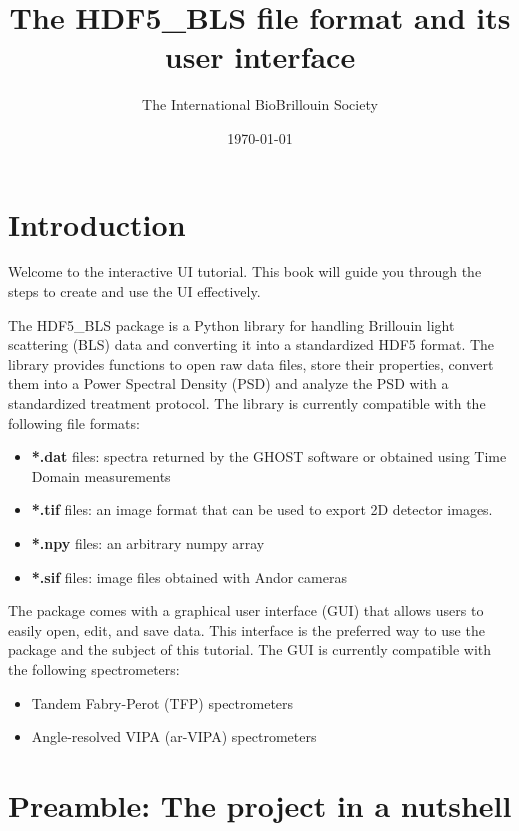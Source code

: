 \documentclass{book}
\title{The HDF5\_BLS file format and its user interface}
\author{The International BioBrillouin Society}
\date{\today}
\begin{document}
\maketitle

\tableofcontents

\chapter*{Introduction}
    Welcome to the interactive UI tutorial. This book will guide you through the steps to create and use the UI effectively.

    The HDF5\_BLS package is a Python library for handling Brillouin light scattering (BLS) data and converting it into a standardized HDF5 format. The library provides functions to open raw data files, store their properties, convert them into a Power Spectral Density (PSD) and analyze the PSD with a standardized treatment protocol. The library is currently compatible with the following file formats:
    \begin{itemize}
        \item \textbf{*.dat} files: spectra returned by the GHOST software or obtained using Time Domain measurements
        \item \textbf{*.tif} files: an image format that can be used to export 2D detector images.
        \item \textbf{*.npy} files: an arbitrary numpy array
        \item \textbf{*.sif} files: image files obtained with Andor cameras
    \end{itemize}

    The package comes with a graphical user interface (GUI) that allows users to easily open, edit, and save data. This interface is the preferred way to use the package and the subject of this tutorial. The GUI is currently compatible with the following spectrometers:
    \begin{itemize}
        \item Tandem Fabry-Perot (TFP) spectrometers
        \item Angle-resolved VIPA (ar-VIPA) spectrometers 
    \end{itemize}

\chapter*{Preamble: The project in a nutshell}
\end{document}
